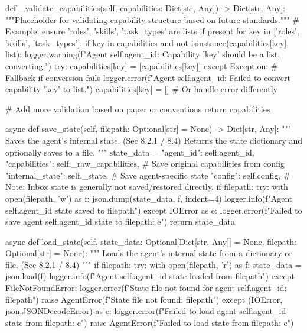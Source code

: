 \documentclass{amsbook}
\theoremstyle{definition}
\theoremstyle{remark}
\numberwithin{equation}{chapter} %
\begin{document}
\begin{python}
    def _validate_capabilities(self, capabilities: Dict[str, Any]) -> Dict[str, Any]:
        """Placeholder for validating capability structure based on future standards."""
        # Example: ensure 'roles', 'skills', 'task_types' are lists if present
        for key in ['roles', 'skills', 'task_types']:
            if key in capabilities and not isinstance(capabilities[key], list):
                logger.warning(f"Agent {self.agent_id}: Capability '{key}' should be a list, converting.")
                try:
                    capabilities[key] = [capabilities[key]]
                except Exception: # Fallback if conversion fails
                     logger.error(f"Agent {self.agent_id}: Failed to convert capability '{key}' to list.")
                     capabilities[key] = [] # Or handle error differently

        # Add more validation based on paper or conventions
        return capabilities

    async def save_state(self, filepath: Optional[str] = None) -> Dict[str, Any]:
        """
        Saves the agent's internal state. (Sec 8.2.1 / 8.4)
        Returns the state dictionary and optionally saves to a file.
        """
        state_data = {
            "agent_id": self.agent_id,
            "capabilities": self._raw_capabilities, # Save original capabilities from config
            "internal_state": self._state, # Save agent-specific state
            "config": self.config,
            # Note: Inbox state is generally not saved/restored directly.
        }
        if filepath:
            try:
                with open(filepath, 'w') as f:
                    json.dump(state_data, f, indent=4)
                logger.info(f"Agent {self.agent_id} state saved to {filepath}")
            except IOError as e:
                logger.error(f"Failed to save agent {self.agent_id} state to {filepath}: {e}")
        return state_data

    async def load_state(self, state_data: Optional[Dict[str, Any]] = None, filepath: Optional[str] = None):
        """
        Loads the agent's internal state from a dictionary or file. (Sec 8.2.1 / 8.4)
        """
        if filepath:
            try:
                with open(filepath, 'r') as f:
                    state_data = json.load(f)
                logger.info(f"Agent {self.agent_id} state loaded from {filepath}")
            except FileNotFoundError:
                logger.error(f"State file not found for agent {self.agent_id}: {filepath}")
                raise AgentError(f"State file not found: {filepath}")
            except (IOError, json.JSONDecodeError) as e:
                logger.error(f"Failed to load agent {self.agent_id} state from {filepath}: {e}")
                raise AgentError(f"Failed to load state from {filepath}: {e}")


\end{python}
\end{document}
